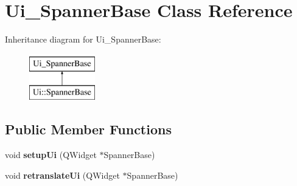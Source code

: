\hypertarget{class_ui___spanner_base}{}\section{Ui\+\_\+\+Spanner\+Base Class Reference}
\label{class_ui___spanner_base}
Inheritance diagram for Ui\+\_\+\+Spanner\+Base\+:\begin{figure}[H]
\begin{center}
\leavevmode
\includegraphics[height=2.000000cm]{class_ui___spanner_base}
\end{center}
\end{figure}
\subsection*{Public Member Functions}
\begin{DoxyCompactItemize}
\item 
\mbox{\label{class_ui___spanner_base_adfe5872193fa64b1ad0f6f5667a17cdd}} 
void {\bfseries setup\+Ui} (Q\+Widget $\ast$Spanner\+Base)
\item 
\mbox{\label{class_ui___spanner_base_a01f5eca31a336760857951df9d40cec2}} 
void {\bfseries retranslate\+Ui} (Q\+Widget $\ast$Spanner\+Base)
\end{DoxyCompactItemize}
